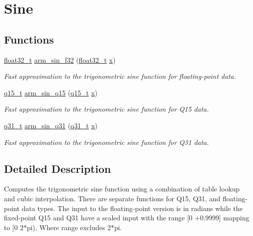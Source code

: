 \hypertarget{group__sin}{\section{Sine}
\label{group__sin}
}
\subsection*{Functions}
\begin{DoxyCompactItemize}
\item 
\hyperlink{arm__math_8h_a4611b605e45ab401f02cab15c5e38715}{float32\-\_\-t} \hyperlink{group__sin_gae164899c4a3fc0e946dc5d55555fe541}{arm\-\_\-sin\-\_\-f32} (\hyperlink{arm__math_8h_a4611b605e45ab401f02cab15c5e38715}{float32\-\_\-t} \hyperlink{pios__opahrs__proto_8h_ad0da36b2558901e21e7a30f6c227a45e}{x})
\begin{DoxyCompactList}\small\item\em Fast approximation to the trigonometric sine function for floating-\/point data. \end{DoxyCompactList}\item 
\hyperlink{arm__math_8h_ab5a8fb21a5b3b983d5f54f31614052ea}{q15\-\_\-t} \hyperlink{group__sin_ga1fc6d6640be6cfa688a8bea0a48397ee}{arm\-\_\-sin\-\_\-q15} (\hyperlink{arm__math_8h_ab5a8fb21a5b3b983d5f54f31614052ea}{q15\-\_\-t} \hyperlink{pios__opahrs__proto_8h_ad0da36b2558901e21e7a30f6c227a45e}{x})
\begin{DoxyCompactList}\small\item\em Fast approximation to the trigonometric sine function for Q15 data. \end{DoxyCompactList}\item 
\hyperlink{arm__math_8h_adc89a3547f5324b7b3b95adec3806bc0}{q31\-\_\-t} \hyperlink{group__sin_ga57aade7d8892585992cdc6375bd82f9c}{arm\-\_\-sin\-\_\-q31} (\hyperlink{arm__math_8h_adc89a3547f5324b7b3b95adec3806bc0}{q31\-\_\-t} \hyperlink{pios__opahrs__proto_8h_ad0da36b2558901e21e7a30f6c227a45e}{x})
\begin{DoxyCompactList}\small\item\em Fast approximation to the trigonometric sine function for Q31 data. \end{DoxyCompactList}\end{DoxyCompactItemize}


\subsection{Detailed Description}
Computes the trigonometric sine function using a combination of table lookup and cubic interpolation. There are separate functions for Q15, Q31, and floating-\/point data types. The input to the floating-\/point version is in radians while the fixed-\/point Q15 and Q31 have a scaled input with the range \mbox{[}0 +0.9999\mbox{]} mapping to \mbox{[}0 2$\ast$pi), Where range excludes 2$\ast$pi.

